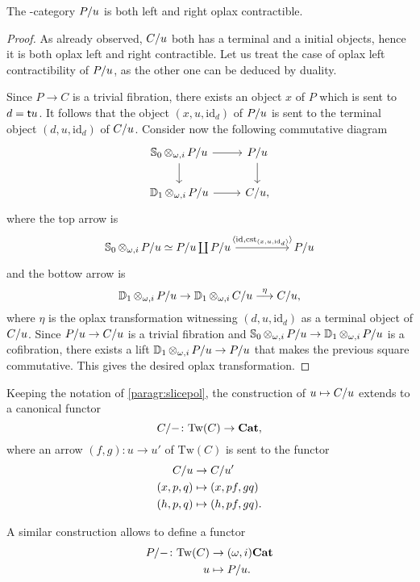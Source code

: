 \documentclass{amsart}
\newcommand{\Tw}[1]{\mathrm{Tw}(#1)}
\newcommand{\id}{\mathrm{id}}
\renewcommand{\tge}[1]{\target{} #1}
\begin{document}
  \begin{lemma}\label{lemma:oplaxterm}
  The \oo\nbd-category $P/u$ is both left and right oplax contractible.
  \end{lemma}
  \begin{proof}
    As already observed, $C/u$ both has a terminal and a initial
    objects, hence it is both oplax left and right contractible. Let us treat the case of
    oplax left contractibility of $P/u$, as the other one can be
    deduced by duality.

    Since $P \to C$ is a trivial fibration, there exists an object $x$
    of $P$ which is sent to $d=\tge{u}$. It follows that the object
    $(x,u,\id_d)$ of $P/u$ is sent to the terminal object
    $(d,u,\id_d)$ of $C/u$. Consider now the following
    commutative diagram
    \[
      \begin{tikzcd}
        \Sph{0}\tens_{\omega,i}\tr{P}{u} \ar[r] \ar[d] & \tr{P}{u} \ar[d]\\
        \Dsk{1}\tens_{\omega,i}\tr{P}{u} \ar[r] & \tr{C}{u},
      \end{tikzcd}
    \]
    where the top arrow is
    \[
      \begin{tikzcd}[column sep=huge]
      \Sph{0}\tens_{\omega,i}\tr{P}{u} \simeq \tr{P}{u}\coprod\tr{P}{u}
      \ar[r,"{\langle\id,\mathrm{cst}_{(x,u,\id_d)}\rangle}"]&\tr{P}{u}
      \end{tikzcd}
    \]
    and the bottow arrow is
    \[
      \mathbb{D}_{1}\operatorname{\otimes}_{\omega,i}P/u \to
      \mathbb{D}_{1}\operatorname{\otimes}_{\omega,i}C/u \overset{\eta}{\longrightarrow}
       C/u,
     \]
     where $\eta$ is the oplax transformation witnessing $(d,u,\id_d)$
     as a terminal object of $C/u$. 
    Since $P/u\to C/u$ is a trivial fibration and
    $\mathbb{S}_{0}\operatorname{\otimes}_{\omega,i}P/u \to \mathbb{D}_{1}\operatorname{\otimes}_{\omega,i}P/u$ is a
    cofibration, there exists a lift $\mathbb{D}_{1}\operatorname{\otimes}_{\omega,i}P/u
    \to P/u$ that makes the previous square commutative. This
    gives the desired oplax transformation.
  \end{proof}
  \begin{paragr}
      Keeping the notation of \ref{paragr:slicepol}, the construction of $u\mapsto C/u$ extends to a canonical functor
    \[
        \tr{C}{-}\colon \Tw{C} \to \Cat,
      \]
      where an arrow $(f,g) \colon u \to u'$ of $\Tw{C}$ is sent to the functor
      \[
        \begin{aligned}
          C/u &\to C/u'\\
          (x,p,q) &\mapsto (x,pf,gq)\\
          (h,p,q) &\mapsto (h,pf,gq).
        \end{aligned}
      \]
      
    A similar construction allows to define a functor
    \[
      \begin{aligned}
       \tr{P}{-}\colon \Tw{C} &\to \opCat{i} \\
        u &\mapsto \tr{P}{u}.
      \end{aligned}
    \]
  \end{paragr}
\end{document}
